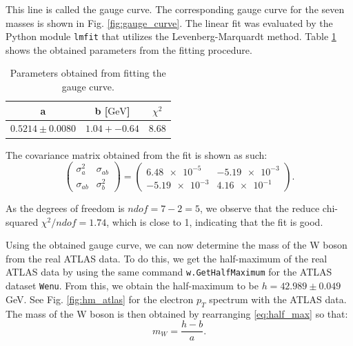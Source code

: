 \documentclass[a4paper]{report}
\numberwithin{equation}{section}
\begin{document}
This line is called the gauge curve. The corresponding gauge curve for the seven masses is shown in Fig. \ref{fig:gauge_curve}. The 
linear fit was evaluated by the Python module \texttt{lmfit} that utilizes the Levenberg-Marquardt method. Table \ref{tab:gauge_params} 
shows the obtained parameters from the fitting procedure.

\begin{table}
    \centering
    \begin{tabular}{|c|c|c|} \hline
    a & b [$\si{\giga\electronvolt}$] &  $\chi^2$  \\ \hline
    $0.5214 \pm 0.0080$ & $1.04 +- 0.64$  & 8.68  \\ \hline
    \end{tabular}
    \caption{Parameters obtained from fitting the gauge curve.}
    \label{tab:gauge_params}
\end{table}

The covariance matrix obtained from the fit is shown as such: 
\begin{equation}
    \begin{pmatrix}
        \sigma_a^2 & \sigma_{ab} \\ 
        \sigma_{ab} & \sigma_b^2 
    \end{pmatrix}
    =
    \begin{pmatrix}
        \num{6.48e-5} & \num{-5.19e-3} \\
        \num{-5.19e-3} & \num{4.16e-1}
    \end{pmatrix} .
    \label{eq:cov_matrix}
\end{equation}

As the degrees of freedom is $ndof = 7 - 2 = 5$, we observe that the reduce chi-squared $\chi^2 / ndof = 1.74$, which is close to 1, 
indicating that the fit is good.\par 

Using the obtained gauge curve, we can now determine the mass of the W boson from the real ATLAS data. To do this, we get the 
half-maximum of the real ATLAS data by using the same command \texttt{w.GetHalfMaximum} for the ATLAS dataset \texttt{Wenu}. From this, 
we obtain the half-maximum to be $h = 42.989 \pm 0.049$ GeV. See Fig. \ref{fig:hm_atlas} for the electron $p_T$ spectrum with the ATLAS data. 
The mass of the W boson is then obtained by rearranging \ref{eq:half_max} so that:
\begin{equation}
    m_W = \frac{h - b}{a}.
\end{equation} 
\end{document}
